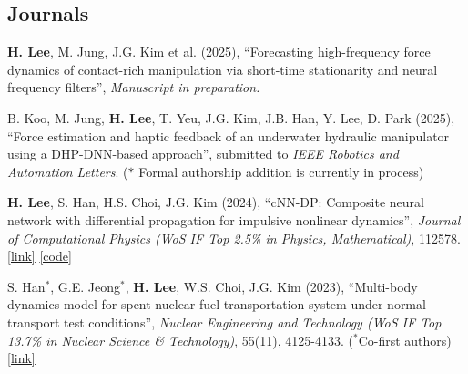 \documentclass[a4paper,10pt]{extarticle}
\begin{document}
\subsection*{Journals}
\begin{etaremune}[leftmargin=.5cm, itemsep=0.02cm]
	\item \textbf{H. Lee}, M. Jung, J.G. Kim et al. (2025), “Forecasting high-frequency force dynamics of contact-rich manipulation via short-time stationarity and neural frequency filters”, \textit{Manuscript in preparation.}

	\item B. Koo, M. Jung, \textbf{H. Lee}, T. Yeu, J.G. Kim, J.B. Han, Y. Lee, D. Park (2025), “Force estimation and haptic feedback of an underwater hydraulic manipulator using a DHP-DNN-based approach”, submitted to \textit{IEEE Robotics and Automation Letters}. {\small({$*$ Formal authorship addition is currently in process})}

	\item \textbf{H. Lee}, S. Han, H.S. Choi, J.G. Kim (2024), “cNN-DP: Composite neural network with differential propagation for impulsive nonlinear dynamics”, \textit{Journal of Computational Physics (WoS IF Top 2.5\% in Physics, Mathematical)}, 112578. \href{https://www.sciencedirect.com/science/article/pii/S0021999123006733?casa_token=ARUkhI8XI8YAAAAA:wTzCIauJvSlonWw-J-SlAFqPX6NZRQS-qBX59l4YN5O3caEppoglU0duVmMkZYf4nWYd7tm_D_E}{[link]} \href{https://github.com/leehyeonbeen/cNN-DP}{[code]}

	\item S. Han$^*$, G.E. Jeong$^*$, \textbf{H. Lee}, W.S. Choi, J.G. Kim (2023), “Multi-body dynamics model for spent nuclear fuel transportation system under normal transport test conditions”, \textit{Nuclear Engineering and Technology (WoS IF Top 13.7\% in Nuclear Science \& Technology)}, 55(11), 4125-4133. {\small ($^*$Co-first authors)} \href{https://www.google.com/url?sa=t&rct=j&q=&esrc=s&source=web&cd=&cad=rja&uact=8&ved=2ahUKEwij36zWpNKCAxXMMEQIHSBfBMUQFnoECBEQAQ&url=https%3A%2F%2Fwww.sciencedirect.com%2Fscience%2Farticle%2Fpii%2FS1738573323003492&usg=AOvVaw1zj_G3k5c77uhMNnmu0EEC&opi=89978449}{[link]}
\end{etaremune}

\vspace*{-0.6cm}
\end{document}
